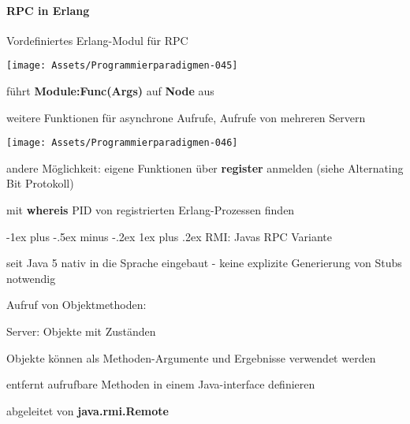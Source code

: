 \documentclass[10pt]{article}
\makeatletter
\renewcommand{\subsubsection}{\@startsection{subsubsection}{3}{0mm}%
                                {-1ex plus -.5ex minus -.2ex}%
                                {1ex plus .2ex}%
                                {\normalfont\small\bfseries}}
\makeatother
\begin{document}
\paragraph{RPC in Erlang}
\begin{itemize*}
  \item Vordefiniertes Erlang-Modul für RPC
  \begin{center}
    \centering
    \texttt{[image: Assets/Programmierparadigmen-045]}
  \end{center}
  \item führt \textbf{Module:Func(Args)} auf \textbf{Node} aus
  \begin{itemize*}
    \item weitere Funktionen für asynchrone Aufrufe, Aufrufe von mehreren Servern
  \end{itemize*}
  \begin{center}
    \centering
    \texttt{[image: Assets/Programmierparadigmen-046]}
  \end{center}
  \item andere Möglichkeit: eigene Funktionen über \textbf{register} anmelden (siehe Alternating Bit Protokoll)
  \item mit \textbf{whereis} PID von registrierten Erlang-Prozessen finden
\end{itemize*}

\subsubsection{RMI: Javas RPC Variante}
\begin{itemize*}
  \item seit Java 5 nativ in die Sprache eingebaut - keine explizite Generierung von Stubs notwendig
  \item Aufruf von Objektmethoden:
  \begin{itemize*}
    \item Server: Objekte mit Zuständen
    \item Objekte können als Methoden-Argumente und Ergebnisse verwendet werden
  \end{itemize*}
  \item entfernt aufrufbare Methoden in einem Java-interface definieren
  \begin{itemize*}
    \item abgeleitet von \textbf{java.rmi.Remote}
  \end{itemize*}
\end{itemize*}
\end{document}
